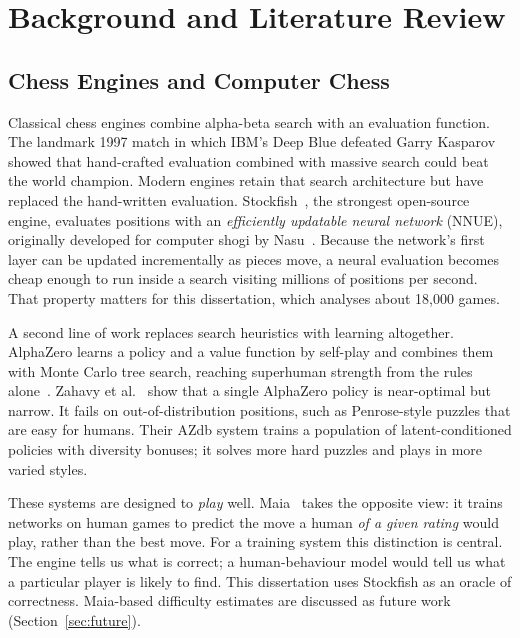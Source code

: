 \chapter{Background and Literature Review}\label{ch:literature}

\section{Chess Engines and Computer Chess}

Classical chess engines combine alpha-beta search with an evaluation function. The landmark
1997 match in which IBM's Deep Blue defeated Garry Kasparov showed that hand-crafted evaluation
combined with massive search could beat the world champion. Modern engines retain that search
architecture but have replaced the hand-written evaluation. Stockfish~\cite{stockfish}, the
strongest open-source engine, evaluates positions with an \emph{efficiently updatable neural
network} (NNUE), originally developed for computer shogi by Nasu~\cite{nasu2018nnue}. Because the
network's first layer can be updated incrementally as pieces move, a neural evaluation becomes
cheap enough to run inside a search visiting millions of positions per second. That property
matters for this dissertation, which analyses about 18,000 games.

A second line of work replaces search heuristics with learning altogether. AlphaZero learns a
policy and a value function by self-play and combines them with Monte Carlo tree search, reaching
superhuman strength from the rules alone~\cite{silver2017mastering,silver2018general}. Zahavy et
al.~\cite{zahavy2023diversifying} show that a single AlphaZero policy is near-optimal but narrow. It
fails on out-of-distribution positions, such as Penrose-style puzzles that are easy for humans.
Their AZdb system trains a population of latent-conditioned policies with diversity bonuses; it
solves more hard puzzles and plays in more varied styles.

These systems are designed to \emph{play} well. Maia~\cite{mcilroyyoung2020aligning} takes the
opposite view: it trains networks on human games to predict the move a human \emph{of a given
rating} would play, rather than the best move. For a training system this distinction is central.
The engine tells us what is correct; a human-behaviour model would tell us what a particular player
is likely to find. This dissertation uses Stockfish as an oracle of correctness. Maia-based
difficulty estimates are discussed as future work (Section~\ref{sec:future}).

